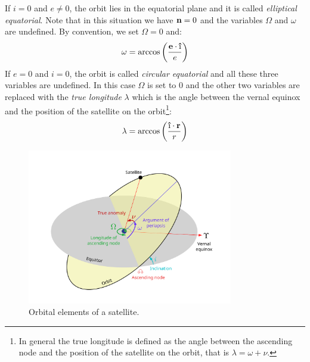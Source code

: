 \documentclass[../main.tex]{subfiles}
\begin{document}
If $i=0$ and $e\ne 0$, the orbit lies in the equatorial plane and it is called \emph{elliptical equatorial}. Note that in this situation we have $\boldsymbol{\mathrm{n}}=0$ and the variables $\Omega$ and $\omega$ are undefined. By convention, we set $\Omega=0$ and:
\begin{equation}
  \omega=\arccos\left(\frac{\vf{e}\cdot \vf{\hat{\text\i}}}{e}\right)
\end{equation}
If $e=0$ and $i=0$, the orbit is called \emph{circular equatorial} and all these three variables are undefined. In this case $\Omega$ is set to 0 and the other two variables are replaced with the \emph{true longitude} $\lambda$ which is the angle between the vernal equinox and the position of the satellite on the orbit\footnote{In general the true longitude is defined as the angle between the ascending node and the position of the satellite on the orbit, that is $\lambda=\omega+\nu$.}:
\begin{equation}
  \lambda = \arccos\left(\frac{\vf{\hat{\text\i}}\cdot \vf{r}}{r}\right)
\end{equation}
\begin{figure}[ht]
  \centering
  \includegraphics[width=0.8\textwidth]{Images/orbital_elements.pdf}
  \caption{Orbital elements of a satellite.}
  \label{fig:orbital_elements}
\end{figure}
\end{document}
